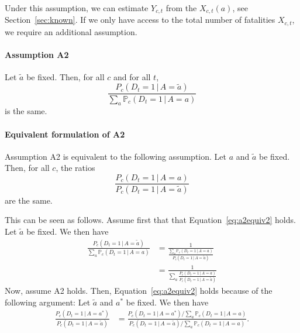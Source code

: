 \documentclass[a4paper]{article}
\renewcommand\P{\mathbb{P}}
\begin{document}
\paragraph{}
Under this assumption, we can estimate $Y_{c,t}$ from the $X_{c,t}(a)$, see Section~\ref{sec:known}. 
If we only have access to the total number of fatalities $X_{c,t}$, we require an additional assumption.


\paragraph{Assumption A2}
Let $\tilde{a}$ be fixed. Then, for all $c$ and for all $t$,
\begin{equation} \label{eq:a2equiv}
\frac{P_c(D_t = 1\,|\,A = \tilde{a})}
{\sum_a \P_c(D_t = 1\,|\,A = a)}
\end{equation}
is the same.





\paragraph{Equivalent formulation of A2}
Assumption A2 is equivalent to the following assumption. 
Let $a$ and $\tilde{a}$ be fixed. Then, for all $c$, the ratios 
\begin{equation} \label{eq:a2equiv2}
\frac{P_c(D_t = 1\,|\,A = a)}{P_c(D_t = 1\,|\,A = \tilde{a})}
\end{equation}
are the same. 

{\color{gray} This can be seen as follows. Assume first that 
that Equation~\eqref{eq:a2equiv2} holds. Let $\tilde{a}$ be fixed. We then have 
\begin{align*}
\frac{P_c(D_t = 1\,|\,A = \tilde{a})}
{\sum_a \P_c(D_t = 1\,|\,A = a)}
&= 
\frac{1}{\frac{\sum_a \P_c(D_t = 1\,|\,A = a)}{P_c(D_t = 1\,|\,A = \tilde{a})}
}\\
&= 
\frac{1}{\sum_a \frac{P_c(D_t = 1\,|\,A = a)}{P_c(D_t = 1\,|\,A = \tilde{a})}
}
\end{align*}
Now, assume 
A2 holds. Then, Equation~\eqref{eq:a2equiv2} holds because of the following argument:  Let $\tilde{a}$ and $a^*$ be fixed. We then have
\begin{align*}
\frac{P_c(D_t = 1\,|\,A = a^*)}
{P_c(D_t = 1\,|\,A = \tilde{a})}
&= 
\frac{P_c(D_t = 1\,|\,A = a^*)/\sum_a \P_c(D_t = 1\,|\,A = a)
}
{P_c(D_t = 1\,|\,A = \tilde{a})/\sum_a \P_c(D_t = 1\,|\,A = a)
}.
\end{align*}}
\end{document}
